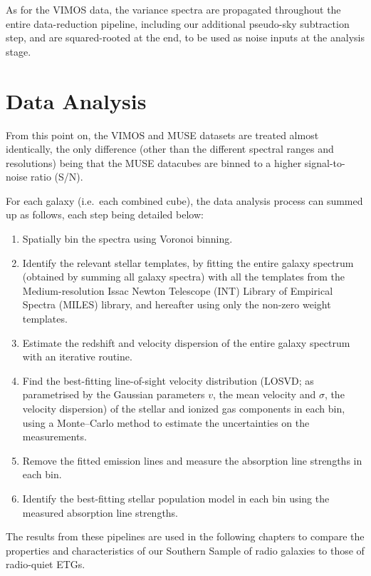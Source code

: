 		As for the VIMOS data, the variance spectra are propagated throughout the entire data-reduction pipeline, including our additional pseudo-sky subtraction step, and are squared-rooted at the end, to be used as noise inputs at the analysis stage. 

\section{Data Analysis}
	\label{sec:analysis}
	From this point on, the VIMOS and MUSE datasets are treated almost identically, the only difference (other than the different spectral ranges and resolutions) being that the MUSE datacubes are binned to a higher signal-to-noise ratio (S/N).

	For each galaxy (i.e.\ each combined cube), the data analysis process can summed up as follows, each step being detailed below:
	\begin{enumerate}
		\item Spatially bin the spectra using Voronoi binning.
		\item Identify the relevant stellar templates, by fitting the entire galaxy spectrum (obtained by summing all galaxy spectra) with all the templates from the Medium-resolution Issac Newton Telescope (INT) Library of Empirical Spectra (MILES) library, and hereafter using only the non-zero weight templates.
		\item Estimate the redshift and velocity dispersion of the entire galaxy spectrum with an iterative routine. %
		\item Find the best-fitting line-of-sight velocity distribution (LOSVD; as parametrised by the Gaussian parameters $v$, the mean velocity and $\sigma$, the velocity dispersion) of the stellar and ionized gas components in each bin, using a Monte--Carlo method to estimate the uncertainties on the measurements. 
		\item Remove the fitted emission lines and measure the absorption line strengths in each bin. 
		\item Identify the best-fitting stellar population model in each bin using the measured absorption line strengths.
	\end{enumerate}

	The results from these pipelines are used in the following chapters to compare the properties and characteristics of our Southern Sample of radio galaxies to those of radio-quiet ETGs. 
	
